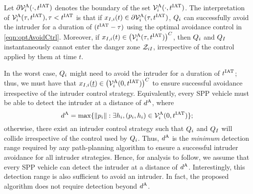 Let $\partial \mathcal{V}^{\text{A}}_{i}(\cdot, t^\text{IAT})$ denotes the boundary of the set $\mathcal{V}^{\text{A}}_{i}(\cdot, t^\text{IAT})$. The interpretation of $\mathcal{V}^{\text{A}}_{i}(\tau, t^\text{IAT}), \tau < t^\text{IAT}$ is that if $x_{I, i}(t) \in \partial \mathcal{V}^{\text{A}}_{i}(\tau, t^\text{IAT})$, $Q_i$ can successfully avoid the intruder for a duration of $(t^\text{IAT}-\tau)$ using the optimal avoidance control in \eqref{eqn:optAvoidCtrl}. Moreover, if $x_{I, i}(t) \in \left( \mathcal{V}^{\text{A}}_{i}(\tau, t^\text{IAT})\right)^C$, then $Q_i$ and $Q_{I}$ instantaneously cannot enter the danger zone $\mathcal{Z}_{iI}$, irrespective of the control applied by them at time $t$. 

In the worst case, $Q_i$ might need to avoid the intruder for a duration of $t^\text{IAT}$; thus, we must have that $x_{I, i}(\underline{t}) \in \left(\mathcal{V}^{\text{A}}_{i}(0, t^\text{IAT})\right)^C$ to ensure successful avoidance irrespective of the intruder control strategy. Equivalently, every SPP vehicle must be able to detect the intruder at a distance of $d^\text{A}$, where
\begin{equation} \label{eqn:sen_distance}
\dsen = \max\{ \|p_i\|: \exists \npos_i, (p_i, \npos_i) \in \brs^{\text{A}}_{i}(0, \iat) \};
\end{equation} 
otherwise, there exist an intruder control strategy such that $Q_i$ and $Q_{I}$ will collide irrespective of the control used by $Q_i$. Thus, $d^\text{A}$ is the \textit{minimum} detection range required by any path-planning algorithm to ensure a successful intruder avoidance for all intruder strategies. Hence, for analysis to follow, we assume that every SPP vehicle can detect the intruder at a distance of $d^\text{A}$. Interestingly, this detection range is also sufficient to avoid an intruder. In fact, the proposed algorithm does not require detection beyond $d^\text{A}$.
